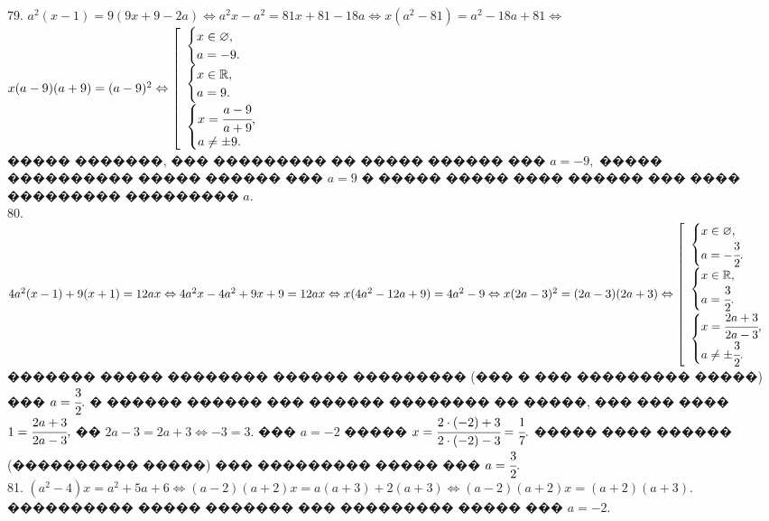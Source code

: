 \documentclass[12pt]{article}
\begin{document}
79. $a^2(x-1)=9(9x+9-2a)\Leftrightarrow a^2x-a^2=81x+81-18a\Leftrightarrow x(a^2-81)=a^2-18a+81\Leftrightarrow$\\$
x(a-9)(a+9)=(a-9)^2\Leftrightarrow\left[\begin{array}{l}\begin{cases} x\in\varnothing,\\ a=-9.\end{cases}\\
\begin{cases} x\in\mathbb{R},\\ a=9.\end{cases}\\\begin{cases} x=\cfrac{a-9}{a+9},\\ a\neq\pm9.\end{cases}\end{array}\right.$\\
����� �������, ��� ��������� �� ����� ������ ��� $a=-9,$ ����� ���������� ����� ������ ��� $a=9$ � ����� ����� ���� ������ ��� ���� ��������� ��������� $a.$\\
80. $4a^2(x-1)+9(x+1)=12ax\Leftrightarrow 4a^2x-4a^2+9x+9=12ax\Leftrightarrow
x(4a^2-12a+9)=4a^2-9\Leftrightarrow x(2a-3)^2=(2a-3)(2a+3)\Leftrightarrow
\left[\begin{array}{l}\begin{cases} x\in\varnothing,\\ a=-\cfrac{3}{2}.\end{cases}\\
\begin{cases} x\in\mathbb{R},\\ a=\cfrac{3}{2}.\end{cases}\\\begin{cases} x=\cfrac{2a+3}{2a-3},\\ a\neq\pm\cfrac{3}{2}.\end{cases}\end{array}\right.$\\
������� ����� �������� ������ ��������� (��� � ��� ��������� �����) ��� $a=\cfrac{3}{2}.$ � ������ ������ ��� ������ �������� �� �����, ��� ��� ���� $1=\cfrac{2a+3}{2a-3},$ �� $2a-3=2a+3\Leftrightarrow -3=3.$ ��� $a=-2$ ����� $x=\cfrac{2\cdot(-2)+3}{2\cdot(-2)-3}=\cfrac{1}{7}.$ ����� ���� ������ (���������� �����) ��� ��������� ����� ��� $a=\cfrac{3}{2}.$\\
81. $(a^2-4)x=a^2+5a+6\Leftrightarrow (a-2)(a+2)x=a(a+3)+2(a+3)\Leftrightarrow(a-2)(a+2)x=(a+2)(a+3).$ ���������� ����� ������� ��� ��������� ����� ��� $a=-2.$\\
\end{document}
